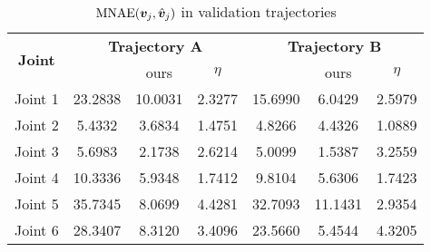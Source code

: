 \begin{table}
\centering
\caption{$\operatorname*{MNAE}(\bm v_j, \hat{\bm v}_j)$ in validation trajectories}
\label{tab:comparison}
\begin{tabular}{|c|ccc|ccc|} 
\hline
\multirow{2}{*}{\textbf{Joint}} & \multicolumn{3}{c|}{\textbf{Trajectory A}} & \multicolumn{3}{c|}{\textbf{Trajectory B}} \\
 & \cite{gaz_model-based_2018} & ours & $\eta$ & \cite{gaz_model-based_2018} & ours & $\eta$ \\ 
\hline
Joint 1 & 23.2838 & 10.0031 & 2.3277 & 15.6990 & 6.0429 & 2.5979 \\
Joint 2 & 5.4332 & 3.6834 & 1.4751 & 4.8266 & 4.4326 & 1.0889 \\
Joint 3 & 5.6983 & 2.1738 & 2.6214 & 5.0099 & 1.5387 & 3.2559 \\
Joint 4 & 10.3336 & 5.9348 & 1.7412 & 9.8104 & 5.6306 & 1.7423 \\
Joint 5 & 35.7345 & 8.0699 & 4.4281 & 32.7093 & 11.1431 & 2.9354 \\
Joint 6 & 28.3407 & 8.3120 & 3.4096 & 23.5660 & 5.4544 & 4.3205 \\
\hline
\end{tabular}
\end{table}